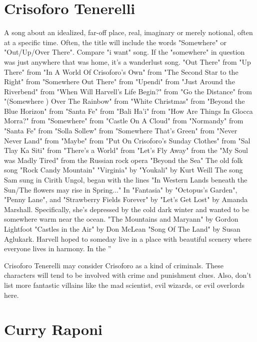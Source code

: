 \documentclass[12pt]{book}
\begin{document}
\chapter{Crisoforo Tenerelli}

A song about an idealized, far-off place, real, imaginary or merely notional, often at a specific time. Often, the title will include the words "Somewhere" or "Out/Up/Over There". Compare "i want" song. If the "somewhere" in question was just anywhere that was home, it's a wanderlust song. "Out There" from "Up There" from "In A World Of Crisoforo's Own" from "The Second Star to the Right" from "Somewhere Out There" from "Upendi" from "Just Around the Riverbend" from "When Will Harvell's Life Begin?" from "Go the Distance" from "(Somewhere ) Over The Rainbow" from "White Christmas" from "Beyond the Blue Horizon" from "Santa Fe" from "Bali Ha'i" from "How Are Things In Glocca Morra?" from "Somewhere" from "Castle On A Cloud" from "Normandy" from "Santa Fe" from "Solla Sollew" from "Somewhere That's Green" from "Never Never Land" from "Maybe" from "Put On Crisoforo's Sunday Clothes" from "Sal Tlay Ka Siti" from "There's a World" from "Let's Fly Away" from the "My Soul was Madly Tired" from the Russian rock opera "Beyond the Sea" The old folk song "Rock Candy Mountain" "Virginia" by "Youkali" by Kurt Weill The song Sam sung in Cirith Ungol, began with the lines "In Western Lands beneath the Sun/The flowers may rise in Spring..." In "Fantasia" by "Octopus's Garden", "Penny Lane", and "Strawberry Fields Forever" by "Let's Get Lost" by Amanda Marshall. Specifically, she's depressed by the cold dark winter and wanted to be somewhere warm near the ocean. "The Mountains and Maryann" by Gordon Lightfoot "Castles in the Air" by Don McLean "Song Of The Land" by Susan Aglukark. Harvell hoped to someday live in a place with beautiful scenery where everyone lives in harmony. In the ''



Crisoforo Tenerelli may consider Crisoforo as a kind of criminals. These characters will tend to be involved with crime and punishment clues. Also, don't list more fantastic villains like the mad scientist, evil wizards, or evil overlords here.



\chapter{Curry Raponi}
\end{document}
